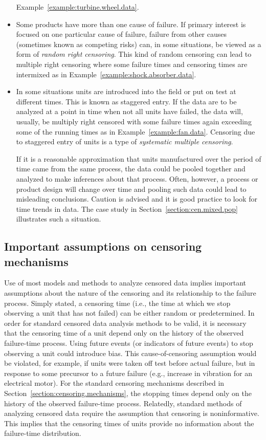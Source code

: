 \begin{itemize}
Example~\ref{example:turbine.wheel.data}.
\item
Some products have more than one cause of failure.  If primary
interest is focused on one particular cause of failure, failure from
other causes (sometimes known as competing risks) can, in some
situations, be viewed as a form of {\em random right censoring}.
This kind of random censoring can lead to multiple right censoring
where some failure times and censoring times are intermixed as in
Example~\ref{example:shock.absorber.data}.
\item
In some situations units are introduced into the field or put on test
at different times. This is known as staggered entry. If the data
are to be analyzed at a point in time when not all units have failed,
the data will, usually, be multiply right censored with some
failure times again exceeding some of the running times as in
Example~\ref{example:fan.data}. Censoring due to staggered entry of
units is a type of {\em systematic multiple censoring}.

If it is a reasonable approximation that units manufactured over the period of
time came from the same process, the data could be pooled together and
analyzed to make inferences about that process.  Often, however, a
process or product design will change over time and pooling such data
could lead to misleading conclusions.  Caution is advised and it is
good practice to look for time trends in data.
The case study in Section~\ref{section:cen.mixed.pop} illustrates such
a situation.
\end{itemize} 

\subsection{Important assumptions on censoring mechanisms}
\label{section:import.cen.assump}
Use of most models and methods to analyze censored data
implies important assumptions about the nature of the censoring
and its relationship to the failure process.
Simply stated, a censoring time (i.e., the time at which we stop
observing a unit that has not failed) can be either random or
predetermined.  In order for standard censored data analysis methods
to be valid, it is necessary that the censoring time of a unit depend
only on the history of the observed failure-time process. Using future
events (or indicators of future events) to stop observing a unit could
introduce bias. This cause-of-censoring assumption would be violated, 
for example, if
units were taken off test before actual failure, but in response to
some precursor to a future failure (e.g., increase in vibration for an
electrical motor).  For the standard censoring mechanisms described in
Section~\ref{section:censoring.mechanisms}, the stopping times
depend only on the history of the observed failure-time process.
Relatedly, standard methods of analyzing censored data require
the assumption that censoring
is noninformative. This implies that the censoring times
of units provide no information about the failure-time distribution.

